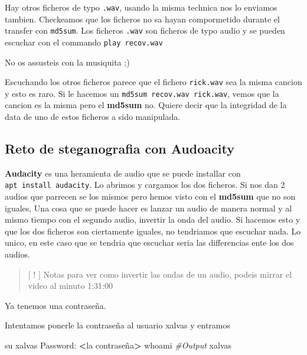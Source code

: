 \documentclass{assets/ipesethesis}
\newenvironment{Shaded}{\begin{snugshade}}{\end{snugshade}}
\newcommand{\CommentTok}[1]{\textcolor[rgb]{0.56,0.35,0.01}{\textit{#1}}}
\newcommand{\ExtensionTok}[1]{#1}
\newcommand{\FunctionTok}[1]{\textcolor[rgb]{0.00,0.00,0.00}{#1}}
\newcommand{\NormalTok}[1]{#1}
\newcommand{\OperatorTok}[1]{\textcolor[rgb]{0.81,0.36,0.00}{\textbf{#1}}}
\begin{document}
Hay otros ficheros de typo \texttt{.wav}, usando la misma technica nos lo enviamos tambien.
Checkeamos que los ficheros no sa hayan compormetido durante el transfer con \texttt{md5sum}. Los ficheros \texttt{.wav} son ficheros
de typo audio y se pueden escuchar con el commando \texttt{play\ recov.wav}

No os assusteis con la musiquita ;)

Escuchando los otros ficheros parece que el fichero \texttt{rick.wav} sea la misma cancion y esto es raro. Si le hacemos un \texttt{md5sum\ recov.wav\ rick.wav},
vemos que la cancion es la misma pero el \textbf{md5sum} no. Quiere decir que la integridad de la data de uno de estos ficheros a sido manipulada.

\hypertarget{reto-de-steganografia-con-audoacity}{%
\subsection*{Reto de steganografia con Audoacity}\label{reto-de-steganografia-con-audoacity}}

\textbf{Audacity} es una heramienta de audio que se puede installar con \texttt{apt\ install\ audacity}. Lo abrimos y cargamos los dos ficheros.
Si nos dan 2 audios que parrecen se los mismos pero hemos visto con el \textbf{md5sum} que no son iguales, Una cosa que se puede hacer es
lanzar un audio de manera normal y al mismo tiempo con el segundo audio, invertir la onda del audio. Si hacemos esto y que los dos ficheros
son ciertamente iguales, no tendriamos que escuchar nada. Lo unico, en este caso que se tendria que escuchar seria las differencias ente
los dos audios.

\begin{quote}
{[} ! {]} Notas para ver como invertir las ondas de un audio, podeis mirrar el video al minuto 1:31:00
\end{quote}

Ya tenemos una contraseña.

Intentamos ponerle la contraseña al usuario xalvas y entramos

\begin{Shaded}
\begin{Highlighting}[]
\FunctionTok{su}\NormalTok{ xalvas}
\ExtensionTok{Password}\NormalTok{: }\OperatorTok{<}\NormalTok{la contraseña}\OperatorTok{>}
\FunctionTok{whoami}
\CommentTok{#Output }
\ExtensionTok{xalvas}
\end{Highlighting}
\end{Shaded}
\end{document}
